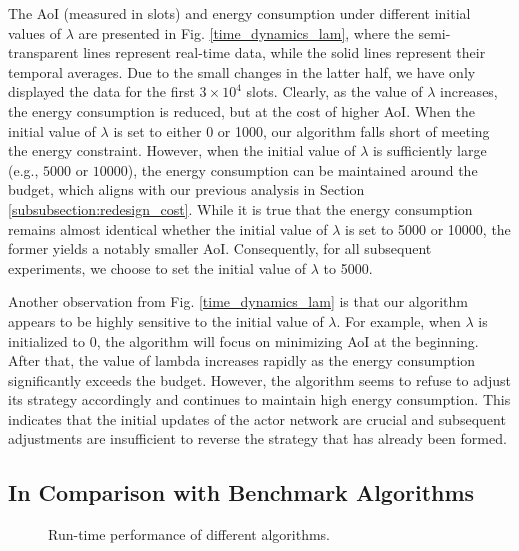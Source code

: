 \documentclass[lettersize, journal]{IEEEtran}
\begin{document}
The AoI (measured in slots) and energy consumption under different initial values of $\lambda$ are presented in Fig. \ref{time_dynamics_lam},
where the semi-transparent lines represent real-time data, while the solid lines represent their temporal averages.
Due to the small changes in the latter half, we have only displayed the data for the first $3\times 10^4$ slots.
Clearly, as the value of $\lambda$ increases, the energy consumption is reduced, but at the cost of higher AoI.
When the initial value of $\lambda$ is set to either 0 or 1000, our algorithm falls short of meeting the energy constraint. 
However, when the initial value of $\lambda$ is sufficiently large (e.g., $5000$ or $10000$), the energy consumption can be maintained around the budget,
which aligns with our previous analysis in Section \ref{subsubsection:redesign_cost}.
While it is true that the energy consumption remains almost identical whether the initial value of $\lambda$ is set to 5000 or 10000, 
the former yields a notably smaller AoI. Consequently, for all subsequent experiments, we choose to set the initial value of $\lambda$ to 5000.

Another observation from Fig. \ref{time_dynamics_lam} is that our algorithm appears to be highly sensitive to the initial value of $\lambda$.
For example, when $\lambda$ is initialized to $0$, the algorithm will focus on minimizing AoI at the beginning.
After that, the value of lambda increases rapidly as the energy consumption significantly exceeds the budget.
However, the algorithm seems to refuse to adjust its strategy accordingly and continues to maintain high energy consumption.
This indicates that the initial updates of the actor network are crucial
and subsequent adjustments are insufficient to reverse the strategy that has already been formed.

\subsection{In Comparison with Benchmark Algorithms}
\begin{figure}[t]
\centering
{}
\vfil
{}
\caption{Run-time performance of different algorithms.}
\label{time_dynamics_benchmark}
\end{figure}
\end{document}
